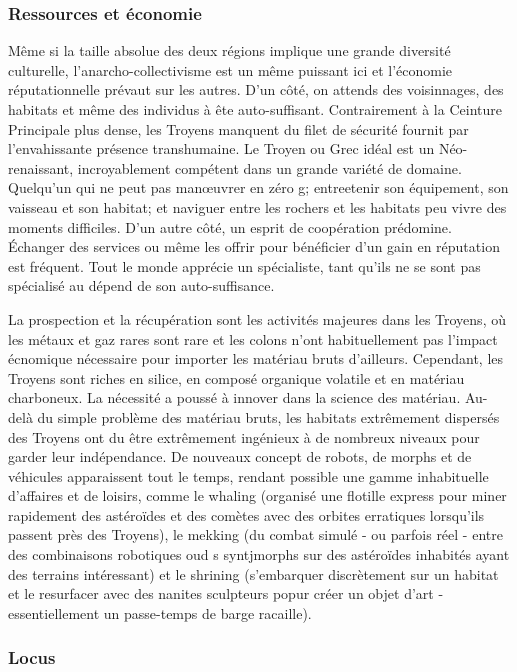 \subsubsection{Ressources et économie} \label{sec:trojans-resources-economics} 

Même si la taille absolue des deux régions implique une grande diversité culturelle, l'anarcho-collectivisme est un même puissant ici et l'économie réputationnelle prévaut sur les autres. D'un côté, on attends des voisinnages, des habitats et même des individus à ête auto-suffisant. Contrairement à la Ceinture Principale plus dense, les Troyens manquent du filet de sécurité fournit par l'envahissante présence transhumaine. Le Troyen ou Grec idéal est un Néo-renaissant, incroyablement compétent dans un grande variété de domaine. Quelqu'un qui ne peut pas manœuvrer en zéro g; entreetenir son équipement, son vaisseau et son habitat; et naviguer entre les rochers et les habitats peu vivre des moments difficiles. D'un autre côté, un esprit de coopération prédomine. Échanger des services ou même les offrir pour bénéficier d'un gain en réputation est fréquent. Tout le monde apprécie un spécialiste, tant qu'ils ne se sont pas spécialisé au dépend de son auto-suffisance. 

La prospection et la récupération sont les activités majeures dans les Troyens, où les métaux et gaz rares sont rare et les colons n'ont habituellement pas l'impact écnomique nécessaire pour importer les matériau bruts d'ailleurs. Cependant, les Troyens sont riches en silice, en composé organique volatile et en matériau charboneux. La nécessité a poussé à innover dans la science des matériau. Au-delà du simple problème des matériau bruts, les habitats extrêmement dispersés des Troyens ont du être extrêmement ingénieux à de nombreux niveaux pour garder leur indépendance. De nouveaux concept de robots, de morphs et de véhicules apparaissent tout le temps, rendant possible une gamme inhabituelle d'affaires et de loisirs, comme le whaling (organisé une flotille express pour miner rapidement des astéroïdes et des comètes avec des orbites erratiques lorsqu'ils passent près des Troyens), le mekking (du combat simulé - ou parfois réel - entre des combinaisons robotiques oud s syntjmorphs sur des astéroïdes inhabités ayant des terrains intéressant) et le shrining (s'embarquer discrètement sur un habitat et le resurfacer avec des nanites sculpteurs popur créer un objet d'art - essentiellement un passe-temps de barge racaille). 

\subsubsection{Locus} \label{sec:locus} 

